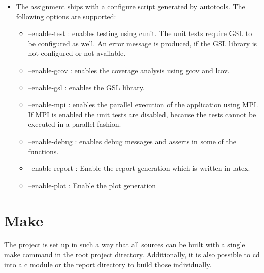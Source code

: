 \documentclass[12pt,a4paper]{report}
\begin{document}
\begin{itemize}
\item The assignment ships with a configure script generated by
  autotools. The following options are supported:
  \begin{itemize}
  \item --enable-test : enables testing using cunit. The unit tests
    require GSL to be configured as well. An error message is
    produced, if the GSL library is not configured or not available.
  \item --enable-gcov : enables the coverage analysis using gcov and
    lcov.
  \item --enable-gsl : enables the GSL library.
  \item --enable-mpi : enables the parallel execution of the
    application using MPI. If MPI is enabled the unit tests are
    disabled, because the tests cannot be executed in a parallel fashion.
  \item --enable-debug : enables debug messages and asserts in some of
    the functions.
  \item --enable-report : Enable the report generation which is
    written in latex.
  \item --enable-plot : Enable the plot generation
  \end{itemize}
\end{itemize}

\section{Make}
\label{sec:make}

The project is set up in such a way that all sources can be built with
a single make command in the root project directory. Additionally, it
is also possible to cd into a c module or the report directory to
build those individually.
\end{document}
